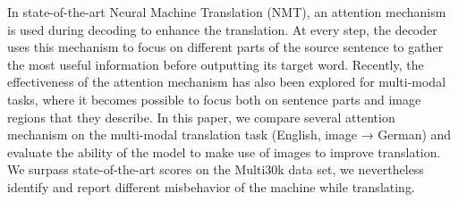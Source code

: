 In state-of-the-art Neural Machine Translation (NMT), an attention mechanism is used during decoding to enhance the translation. At every step, the decoder uses this mechanism to focus on different parts of the source sentence to gather the most useful information before outputting its target word. Recently, the effectiveness of the attention mechanism has also been explored for multi-modal tasks, where it becomes possible to focus both on sentence parts and image regions that they describe. In this paper, we compare several attention mechanism on the multi-modal translation task (English, image → German) and evaluate the ability of the model to make use of images to improve translation. We surpass state-of-the-art scores on the Multi30k data set, we nevertheless identify and report different misbehavior of the machine while translating.
